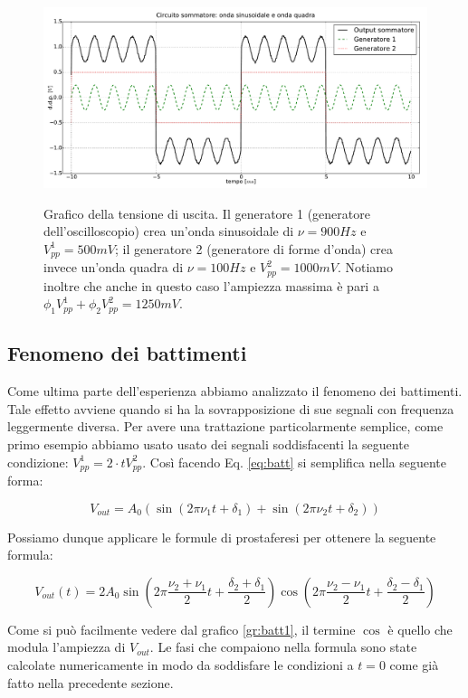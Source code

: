 \begin{figure}[H]
 \centering
   {\includegraphics[width=15cm]{../E01/latex/sinquad.pdf}}
 \caption{Grafico della tensione di uscita. Il generatore 1 (generatore dell'oscilloscopio) crea un'onda sinusoidale di $\nu=900 Hz$ e $V^1_{pp}=500 mV$; il generatore 2 (generatore di forme d'onda) crea invece un'onda quadra di $\nu=100 Hz$ e $V^2_{pp}=1000 mV$. Notiamo inoltre che anche in questo caso l'ampiezza massima è pari a $\phi_1 V^1_{pp}+\phi_2 V^2_{pp}=1250 mV$.}
 \label{gr:onde2}
\end{figure}


\subsection{Fenomeno dei battimenti}

Come ultima parte dell'esperienza abbiamo analizzato il fenomeno dei battimenti. Tale effetto avviene quando si ha la sovrapposizione di sue segnali con frequenza leggermente diversa. Per avere una trattazione particolarmente semplice, come primo esempio abbiamo usato usato dei segnali soddisfacenti la seguente condizione: $V^1_{pp}=2 \cdot tV^2_{pp}$. Così facendo Eq. \ref{eq:batt} si semplifica nella seguente forma:

$$V_{out}=A_0 (\sin(2 \pi \nu_1t+ \delta_1)+\sin(2 \pi \nu_2t+ \delta_2))$$

Possiamo dunque applicare le formule di prostaferesi per ottenere la seguente formula:

$$V_{out}(t)=2A_0\sin(2\pi\frac{\nu_2+\nu_1}{2}t+\frac{\delta_2+\delta_1}{2})\cos(2\pi\frac{\nu_2-\nu_1}{2}t+\frac{\delta_2-\delta_1}{2})$$

Come si può facilmente vedere dal grafico \ref{gr:batt1}, il termine $\cos$ è quello che modula l'ampiezza di $V_{out}$. Le fasi che compaiono nella formula sono state calcolate numericamente in modo da soddisfare le condizioni a $t=0$ come già fatto nella precedente sezione.


